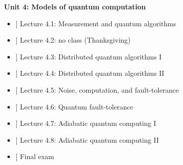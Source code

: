 \documentclass[preprint,pra,12pt]{ikedoc3}
\begin{document}
\noindent
{\bf Unit 4: Models of quantum computation}

\begin{itemize}
  \setlength\itemsep{0.1em}
\item[\bf [11/21]] Lecture 4.1: Measurement and quantum algorithms
\item[\bf [11/23]] Lecture 4.2: no class (Thanksgiving)
\item[\bf [11/28]] Lecture 4.3: Distributed quantum algorithms I
\item[\bf [11/28]] Lecture 4.4: Distributed quantum algorithms II
\item[\bf [11/30]] Lecture 4.5: Noise, computation, and fault-tolerance
\item[\bf [12/5]] Lecture 4.6: Quantum fault-tolerance
\item[\bf [12/7]] Lecture 4.7: Adiabatic quantum computing I
\item[\bf [12/12]] Lecture 4.8: Adiabatic quantum computing II
\end{itemize}

\begin{itemize}
\item[\bf [12/TBD]] Final exam
\end{itemize}
\end{document}
